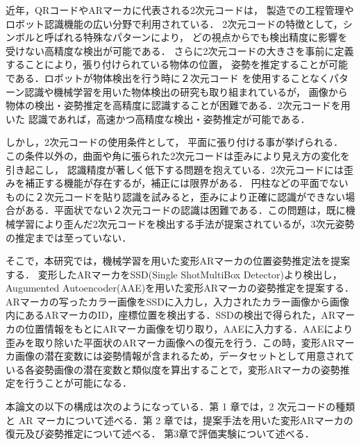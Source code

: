近年，QRコードやARマーカに代表される2次元コードは，
製造での工程管理やロボット認識機能の広い分野で利用されている．
2次元コードの特徴として，シンボルと呼ばれる特殊なパターンにより，
どの視点からでも検出精度に影響を受けない高精度な検出が可能である．
さらに2次元コードの大きさを事前に定義することにより，張り付けられている物体の位置，
姿勢を推定することが可能\cite{1}\cite{2}\cite{3}\cite{4}である．ロボットが物体検出を行う時に２次元コード
を使用することなくパターン認識や機械学習を用いた物体検出の研究も取り組まれているが，
画像から物体の検出・姿勢推定を高精度に認識することが困難である．2次元コードを用いた
認識であれば，高速かつ高精度な検出・姿勢推定が可能\cite{5}\cite{6}\cite{7}である．

しかし，2次元コードの使用条件として，
平面に張り付ける事が挙げられる．
この条件以外の，曲面や角に張られた2次元コードは歪みにより見え方の変化を引き起こし，
認識精度が著しく低下する問題を抱えている．2次元コードには歪みを補正する機能が存在するが，補正には限界がある．
円柱などの平面でないものに２次元コードを貼り認識を試みると，歪みにより正確に認識ができない場合がある．平面状でない２次元コードの認識は困難である．この問題は，既に機械学習により歪んだ2次元コードを検出する手法\cite{suzuki}が提案されているが，3次元姿勢の推定までは至っていない．

そこで，本研究では，機械学習を用いた変形ARマーカの位置姿勢推定法を提案する．
変形したARマーカをSSD(Single ShotMultiBox Detector)\cite{SSD}より検出し，
Augumented Autoencoder(AAE)\cite{AAE}を用いた変形ARマーカの姿勢推定を提案する．
ARマーカの写ったカラー画像をSSDに入力し，入力されたカラー画像から画像内にあるARマーカのID，座標位置を検出する．SSDの検出で得られた，ARマーカの位置情報をもとにARマーカ画像を切り取り，AAEに入力する．AAEにより歪みを取り除いた平面状のARマーカ画像への復元を行う．この時，変形ARマーカ画像の潜在変数には姿勢情報が含まれるため，データセットとして用意されている各姿勢画像の潜在変数と類似度を算出することで，変形ARマーカの姿勢推定を行うことが可能になる．


本論文の以下の構成は次のようになっている．第 1 章では，2 次元コードの種類と AR
マーカについて述べる．第 2 章では，提案手法を用いた変形ARマーカの復元及び姿勢推定について述べる．
第3章で評価実験について述べる．